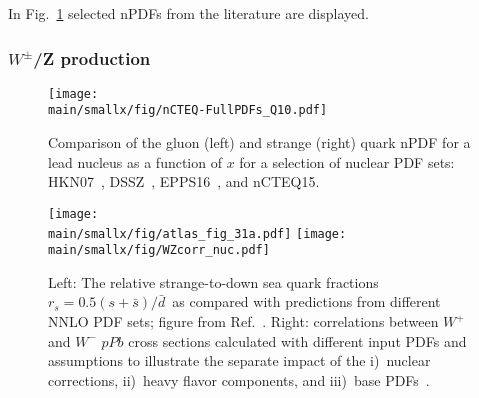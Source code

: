 \documentclass[../report.tex]{subfiles}
\providecommand{\main}{..}
\begin{document}
In Fig.~\ref{fig:npdf} selected nPDFs from the literature are displayed. 


\subsubsection{$W^\pm$/Z production}

\begin{figure}[tbh] %
\centering{} 
\texttt{[image: \\main/smallx/fig/nCTEQ-FullPDFs\_Q10.pdf]}
\caption{
Comparison of the gluon (left) and strange (right) quark nPDF for a lead nucleus as a function of $x$ for 
a selection of nuclear PDF sets:
HKN07~\cite{Hirai:2004wq}, DSSZ~\cite{deFlorian:2011fp}, EPPS16~\cite{Eskola:2016oht}, and nCTEQ15\cite{Kovarik:2015cma}.
}
\label{fig:npdf}
\end{figure}


\begin{figure}[t] %
\centering{} 
\texttt{[image: \\main/smallx/fig/atlas\_fig\_31a.pdf]}
\hfil
\texttt{[image: \\main/smallx/fig/WZcorr\_nuc.pdf]}
\caption{
Left: The relative strange-to-down sea quark fractions 
$r_s=0.5(s + \bar{s})/\bar{d}$\  as compared with  predictions from different NNLO PDF sets; figure from Ref.~\cite{Aaboud:2016btc}. 
\quad 
Right: correlations between $W^+$ and $W^-$ $pPb$  cross sections calculated with different input PDFs and assumptions   to illustrate the separate impact of the 
i)~nuclear corrections, ii)~heavy flavor components, and iii)~base PDFs~\cite{Kusina:2016fxy,Godat:2018kgp}.}
\label{fig:WZcorr}
\end{figure}

\end{document}
